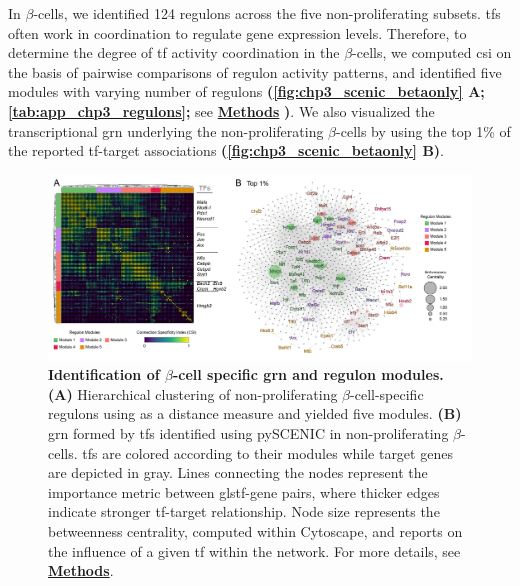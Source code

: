 
\par In $\beta$-cells, we identified 124 regulons across the five non-proliferating subsets. \glspl{tf} often work in coordination to regulate gene expression levels. Therefore, to determine the degree of \gls{tf} activity coordination in the $\beta$-cells, we computed \gls{csi} on the basis of pairwise comparisons of regulon activity patterns, and identified five modules with varying number of regulons \textbf{(\autoref{fig:chp3_scenic_betaonly} A; \autoref{tab:app_chp3_regulons};} see \hyperref[sec:chp3_methods]{\textbf{Methods}} \textbf{)}. We also visualized the transcriptional \gls{grn} underlying the non-proliferating $\beta$-cells by using the top 1\% of the reported \gls{tf}-target associations   \textbf{(\autoref{fig:chp3_scenic_betaonly} B)}.\\

\begin{figure}[t]
\centering
\includegraphics[width=\linewidth]{Chapter5/Fig/F3-10-02.png}
\caption[Identification of $\beta$-cell specific  and regulon modules]{\textbf{Identification of $\beta$-cell specific \gls{grn} and regulon modules.} \textbf{(A)} Hierarchical clustering of non-proliferating $\beta$-cell-specific regulons using  as a distance measure and yielded five modules. \textbf{(B)} \gls{grn} formed by \glspl{tf} identified using pySCENIC in non-proliferating $\beta$-cells. \glspl{tf} are colored according to their modules while target genes are depicted in gray. Lines connecting the nodes represent the importance metric between gls{tf}-gene pairs, where thicker edges indicate stronger \gls{tf}-target relationship. Node size represents the betweenness centrality, computed within Cytoscape, and reports on the influence of a given \gls{tf} within the network. For more details, see \hyperref[sec:chp3_methods]{\textbf{Methods}}.}
\label{fig:chp3_scenic_betaonly}
\end{figure}

